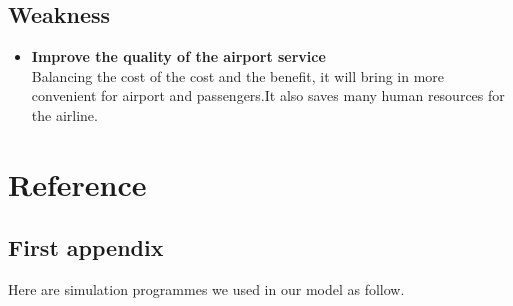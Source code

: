 \documentclass[12pt]{mcmthesis}
\begin{document}
\subsection{Weakness}
\begin{itemize}
  \item \textbf{Improve the quality of the airport service}\\
        Balancing the cost of the cost and the benefit, it will bring in
        more convenient  for airport and passengers.It also saves many
        human resources for the airline.
\end{itemize}
\section{Reference}
\newpage
\begin{appendices}
  \section{First appendix}
  \lipsum[13]
  Here are simulation programmes we used in our model as follow.\\
\end{appendices}
\end{document}
